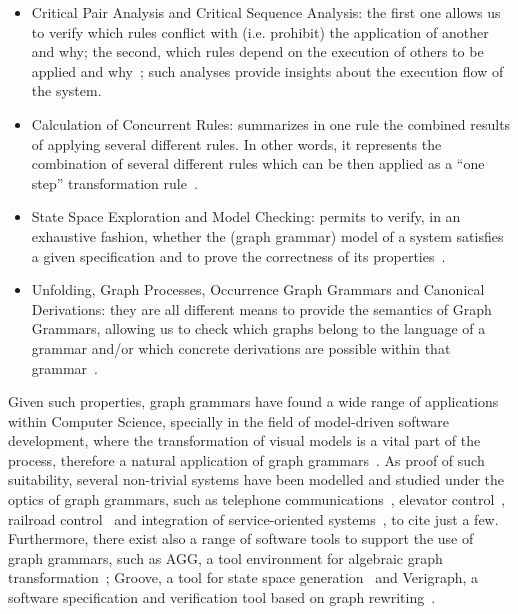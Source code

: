 \begin{itemize}
  \item Critical Pair Analysis and Critical Sequence Analysis: the first one allows us to verify which rules conflict with (i.e. prohibit) the application of another and why; the second, which rules depend on the execution of others to be applied and why~\cite{Lambers2008a}; such analyses provide insights about the execution flow of the system.
  \item Calculation of Concurrent Rules: summarizes in one rule the combined results of applying several different rules. In other words, it represents the combination of several different rules which can be then applied as a ``one step'' transformation rule~\cite{Lambers2008,BezerraETMF2016}.
  \item State Space Exploration and Model Checking: permits to verify, in an exhaustive fashion, whether the (graph grammar) model of a system satisfies a given specification and to prove the correctness of its properties~\cite{Rensink2004}.
  \item Unfolding, Graph Processes, Occurrence Graph Grammars and Canonical Derivations: they are all different means to provide the semantics of Graph Grammars, allowing us to check which graphs belong to the language of a grammar and/or which concrete derivations are possible within that grammar~\cite{Corradini1996,Ribeiro1996}.
\end{itemize}

Given such properties, graph grammars have found a wide range of applications within Computer Science, specially in the field of model-driven software development, where the transformation of visual models is a vital part of the process, therefore a natural application of graph grammars~\cite{Rozenberg1997}. As proof of such suitability, several non-trivial systems have been modelled and studied under the optics of graph grammars, such as telephone communications~\cite{Ribeiro1996}, elevator control~\cite{Lambers2010}, railroad control~\cite{Pennemann2009} and integration of service-oriented systems~\cite{Giese2015}, to cite just a few. Furthermore, there exist also a range of software tools to support the use of graph grammars, such as AGG, a tool environment for algebraic graph transformation~\cite{Taentzer2000}; Groove, a tool for state space generation~\cite{Rensink2004} and Verigraph, a software specification and verification tool based on graph rewriting~\cite{verigraph}.

